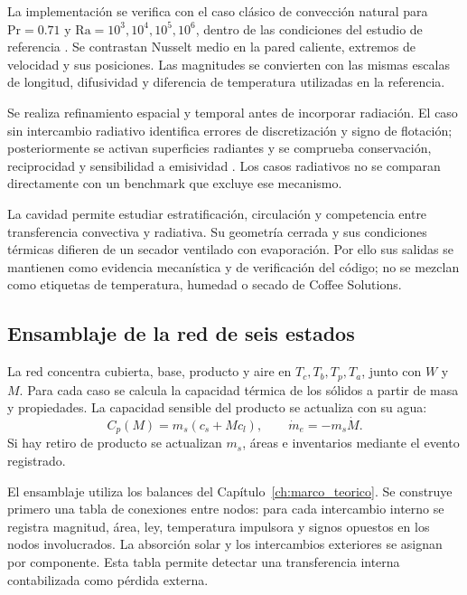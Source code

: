 La implementación se verifica con el caso clásico de convección natural para $\mathrm{Pr}=0.71$ y $\mathrm{Ra}=10^3,10^4,10^5,10^6$, dentro de las condiciones del estudio de referencia \cite{devahl1983}. Se contrastan Nusselt medio en la pared caliente, extremos de velocidad y sus posiciones. Las magnitudes se convierten con las mismas escalas de longitud, difusividad y diferencia de temperatura utilizadas en la referencia.

Se realiza refinamiento espacial y temporal antes de incorporar radiación. El caso sin intercambio radiativo identifica errores de discretización y signo de flotación; posteriormente se activan superficies radiantes y se comprueba conservación, reciprocidad y sensibilidad a emisividad \cite{balaji1993}. Los casos radiativos no se comparan directamente con un benchmark que excluye ese mecanismo.

La cavidad permite estudiar estratificación, circulación y competencia entre transferencia convectiva y radiativa. Su geometría cerrada y sus condiciones térmicas difieren de un secador ventilado con evaporación. Por ello sus salidas se mantienen como evidencia mecanística y de verificación del código; no se mezclan como etiquetas de temperatura, humedad o secado de Coffee Solutions.

\subsection{Ensamblaje de la red de seis estados}
\label{met:red}

La red concentra cubierta, base, producto y aire en $T_c,T_b,T_p,T_a$, junto con $W$ y $M$. Para cada caso se calcula la capacidad térmica de los sólidos a partir de masa y propiedades. La capacidad sensible del producto se actualiza con su agua:
\begin{equation}
C_p(M)=m_s(c_s+Mc_l),\qquad
\dot m_e=-m_s\dot M.
\label{met:capacidad_producto}
\end{equation}
Si hay retiro de producto se actualizan $m_s$, áreas e inventarios mediante el evento registrado.

El ensamblaje utiliza los balances del Capítulo~\ref{ch:marco_teorico}. Se construye primero una tabla de conexiones entre nodos: para cada intercambio interno se registra magnitud, área, ley, temperatura impulsora y signos opuestos en los nodos involucrados. La absorción solar y los intercambios exteriores se asignan por componente. Esta tabla permite detectar una transferencia interna contabilizada como pérdida externa.

